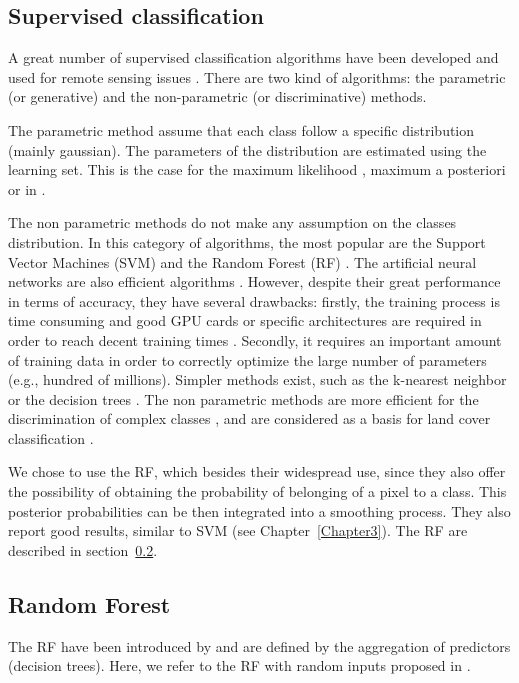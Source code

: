 \subsection{Supervised classification}
A great number of supervised classification algorithms have been developed and used for remote sensing issues \citep{landgrebe2005signal, lu2007survey, mather2016classification}. There are two kind of algorithms: the parametric (or generative) and the non-parametric (or discriminative) methods.

The parametric method assume that each class follow a specific distribution (mainly gaussian). The parameters of the distribution are estimated using the learning set. This is the case for the maximum likelihood \citep{strahler1980use}, maximum a posteriori \citep{fauvel2015fast} or in \cite{trias2005high}.

The non parametric methods do not make any assumption on the classes distribution. In this category of algorithms, the most popular are the Support Vector Machines (SVM) \citep{boser1992training, scholkopf2001learning} and the Random Forest (RF) \citep{breiman2001random}. The artificial neural networks are also efficient algorithms \citep{hepner1990artificial, atkinson1997mapping}. However, despite their great performance in terms of accuracy, they have several drawbacks: firstly, the training process is time consuming and good GPU cards or specific architectures are required in order to reach decent training times \citep{dean2012large, moritz2015sparknet}. Secondly, it requires an important amount of training data in order to correctly optimize the large number of parameters (e.g., hundred of millions). Simpler methods exist, such as the k-nearest neighbor \citep{indyk1998approximate} or the decision trees \citep{breiman1984classification}. The non parametric methods are more efficient  for the discrimination of complex classes \citep{paola1995review, foody2002status}, and are considered as a basis for land cover classification \citep{camps2009kernel}.

We chose to use the RF, which besides their widespread use, since they also offer the possibility of obtaining the probability of belonging of a pixel to a class. This posterior probabilities can be then integrated into a smoothing process. They also report good results, similar to SVM (see Chapter~\ref{Chapter3}). The RF are described in section~\ref{sec:RF}.

\subsection{Random Forest}
\label{sec:RF}
The RF have been introduced by \cite{breiman2001random} and are defined by the aggregation of predictors (decision trees). Here, we refer to the RF with random inputs proposed in \cite{breiman2001random}.

